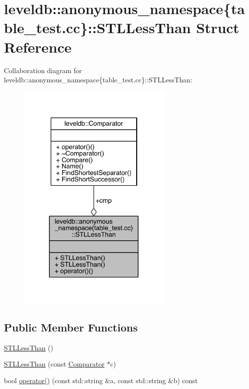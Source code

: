 \hypertarget{structleveldb_1_1anonymous__namespace_02table__test_8cc_03_1_1_s_t_l_less_than}{}\section{leveldb\+:\+:anonymous\+\_\+namespace\{table\+\_\+test.\+cc\}\+:\+:S\+T\+L\+Less\+Than Struct Reference}
\label{structleveldb_1_1anonymous__namespace_02table__test_8cc_03_1_1_s_t_l_less_than}


Collaboration diagram for leveldb\+:\+:anonymous\+\_\+namespace\{table\+\_\+test.\+cc\}\+:\+:S\+T\+L\+Less\+Than\+:
\nopagebreak
\begin{figure}[H]
\begin{center}
\leavevmode
\includegraphics[width=216pt]{structleveldb_1_1anonymous__namespace_02table__test_8cc_03_1_1_s_t_l_less_than__coll__graph}
\end{center}
\end{figure}
\subsection*{Public Member Functions}
\begin{DoxyCompactItemize}
\item 
\hyperlink{structleveldb_1_1anonymous__namespace_02table__test_8cc_03_1_1_s_t_l_less_than_a5bd78f325fbe7e690872f38bf7b69fec}{S\+T\+L\+Less\+Than} ()
\item 
\hyperlink{structleveldb_1_1anonymous__namespace_02table__test_8cc_03_1_1_s_t_l_less_than_a93dd1b52a13f41bf87a09242b4656f7e}{S\+T\+L\+Less\+Than} (const \hyperlink{structleveldb_1_1_comparator}{Comparator} $\ast$c)
\item 
bool \hyperlink{structleveldb_1_1anonymous__namespace_02table__test_8cc_03_1_1_s_t_l_less_than_a9b615149cdd81f3c3ec6ac9e09feb42a}{operator()} (const std\+::string \&a, const std\+::string \&b) const 
\end{DoxyCompactItemize}
